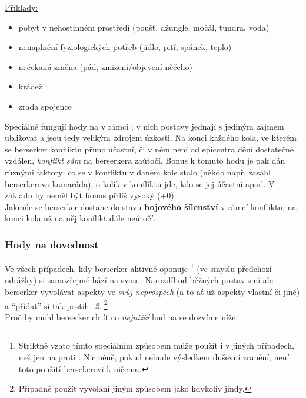 \underline{Příklady:}
\begin{itemize}
\item pobyt v nehostinném prostředí (poušť, džungle, močál, tundra, voda)
\item nenaplnění fyziologických potřeb (jídlo, pití, spánek, teplo)
\item nečekaná změna (pád, zmizení/objevení něčeho)
\item krádež
\item zrada spojence
\end{itemize}

Speciálně fungují hody na  v rámci ; v nich postavy jednají s jediným zájmem ubližovat a jsou tedy velikým zdrojem úzkosti. Na konci každého kola, ve kterém se berserker konfliktu přímo účastní, či v něm není od epicentra dění dostatečně vzdálen, \textit{konflikt sám} na berserkera  zaútočí. Bonus k tomuto hodu je pak dán různými faktory: co se v konfliktu v daném kole stalo (někdo např. zasáhl berserkerova kamaráda), o kolik v konfliktu jde, kdo se jej účastní apod. V základu by neměl být bonus příliš vysoký (+0).\\

Jakmile se berserker dostane do stavu \textbf{bojového šílenství} v rámcí konfliktu, na konci kola už na něj konflikt dále neútočí.
\subsubsection*{Hody na dovednost }
Ve všech případech, kdy berserker aktivně oponuje   \footnote{Striktně vzato tímto speciálním způsobem může použít  i v jiných případech, než jen na  proti . Nicméně, pokud nebude výsledkem duševní zranění, není toto použití bersekerovi k ničemu.} (ve smyslu předchozí odrážky) si samozřejmě hází na  svou . Narozdíl od běžných postav smí ale berserker vyvolávat aspekty ve \textit{svůj neprospěch} (a to ať už aspekty vlastní či jiné) a ``přidat'' si tak postih \textit{-2}. \footnote{Případně použít vyvolání jiným způsobem jako kdykoliv jindy.}\\
Proč by mohl berserker chtít co \textit{nejnižší} hod na  se dozvíme níže.

